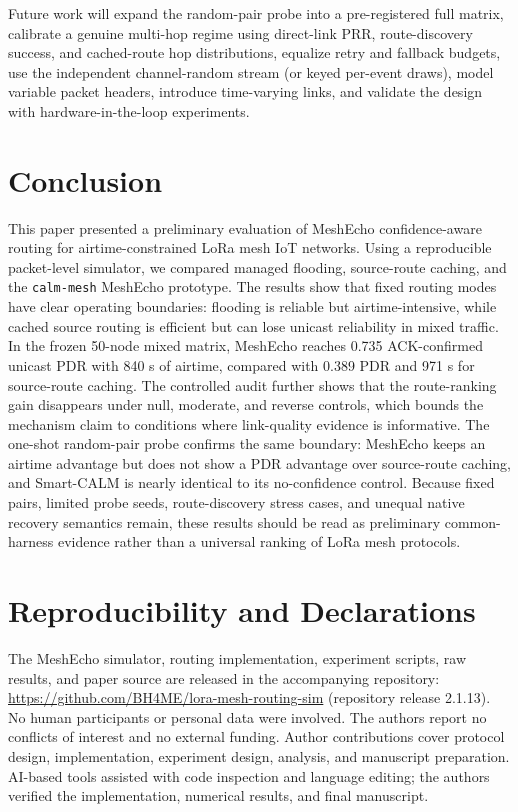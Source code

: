 \documentclass[conference]{IEEEtran}
\begin{document}
Future work will expand the random-pair probe into a pre-registered full matrix,
calibrate a genuine multi-hop regime using direct-link PRR, route-discovery
success, and cached-route hop distributions, equalize retry and fallback
budgets, use the independent channel-random stream (or keyed per-event draws),
model variable packet headers, introduce time-varying links, and validate the
design with hardware-in-the-loop experiments.

\section{Conclusion}

This paper presented a preliminary evaluation of MeshEcho confidence-aware
routing for airtime-constrained LoRa mesh IoT networks. Using a reproducible
packet-level simulator, we compared managed flooding, source-route caching, and
the \texttt{calm-mesh} MeshEcho prototype. The results show that fixed routing
modes have clear operating boundaries: flooding is reliable but
airtime-intensive, while cached source routing is efficient but can lose
unicast reliability in mixed traffic. In the frozen 50-node mixed matrix,
MeshEcho reaches 0.735 ACK-confirmed unicast PDR with 840 s of airtime,
compared with 0.389 PDR and 971 s for source-route caching. The controlled
audit further shows that the route-ranking gain disappears under null,
moderate, and reverse controls, which bounds the mechanism claim to conditions
where link-quality evidence is informative. The one-shot random-pair probe
confirms the same boundary: MeshEcho keeps an airtime advantage but does not
show a PDR advantage over source-route caching, and Smart-CALM is nearly
identical to its no-confidence control. Because fixed pairs, limited probe
seeds, route-discovery stress cases, and unequal native recovery semantics
remain, these results should be read as preliminary common-harness evidence
rather than a universal ranking of LoRa mesh protocols.

\section*{Reproducibility and Declarations}
The MeshEcho simulator, routing implementation, experiment scripts, raw
results, and paper source are released in the accompanying repository:
\url{https://github.com/BH4ME/lora-mesh-routing-sim} (repository release
2.1.13). No human participants or personal data were involved. The authors
report no conflicts of interest and no external funding. Author contributions
cover protocol design, implementation, experiment design, analysis, and
manuscript preparation. AI-based tools assisted with code inspection and
language editing; the authors verified the implementation, numerical results,
and final manuscript.



\end{document}
